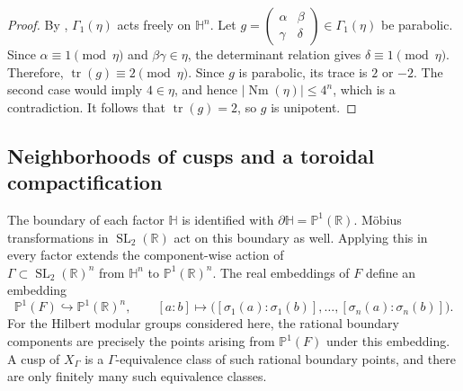 \documentclass[12 pt]{amsart}
\theoremstyle{definition}
\newcommand{\Nm}{\operatorname{Nm}}
\newcommand{\Hu}{\mathbb{H}}
\begin{document}
\begin{proof}
By \cite[Lemma~3.1]{bakker2018geometric}, \(\Gamma_1(\eta)\) acts freely on \(\mathbb H^n\). Let \(g=\left(\begin{smallmatrix}\alpha&\beta\\ \gamma&\delta\end{smallmatrix}\right)\in\Gamma_1(\eta)\) be parabolic. Since \(\alpha\equiv1\pmod{\eta}\) and \(\beta\gamma\in\eta\), the determinant relation gives \(\delta\equiv1\pmod{\eta}\). Therefore, \(\operatorname{tr}(g)\equiv2\pmod{\eta}\). Since \(g\) is parabolic, its trace is \(2\) or \(-2\). The second case would imply \(4\in\eta\), and hence \(|\Nm(\eta)|\leq4^n\), which is a contradiction. It follows that \(\operatorname{tr}(g)=2\), so \(g\) is unipotent.
\end{proof}


\subsection{Neighborhoods of cusps and a toroidal compactification}\label{Neighborhoods of cusps}

The boundary of each factor $\Hu$ is identified with
\(
\partial\Hu=\mathbb P^1(\mathbb R).
\)
M\"obius transformations in $\operatorname{SL}_2(\mathbb R)$ act on
this boundary as well. Applying this in every factor extends the
component-wise action of \\
\(
\Gamma\subset\operatorname{SL}_2(\mathbb R)^n
\)
from $\Hu^n$ to $\mathbb P^1(\mathbb R)^n$. The real embeddings of $F$
define an embedding
\[
\mathbb P^1(F)\hookrightarrow\mathbb P^1(\mathbb R)^n,
\qquad
[a:b]\longmapsto
\bigl([\sigma_1(a):\sigma_1(b)],\ldots,
      [\sigma_n(a):\sigma_n(b)]\bigr).
\]
For the Hilbert modular groups considered here, the rational boundary
components are precisely the points arising from $\mathbb P^1(F)$ under
this embedding. A cusp of $X_\Gamma$ is a $\Gamma$-equivalence class of
such rational boundary points, and
there are only finitely many such equivalence classes.
\end{document}
